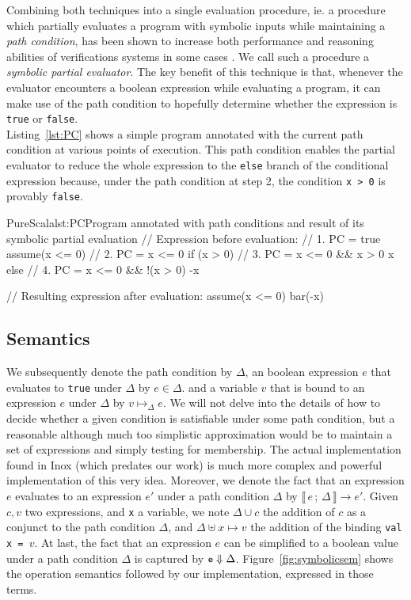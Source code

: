 \documentclass[a4paper,twoside]{article}
\newcommand{\lb}[2]{\llbracket\, #1\,;\, #2\, \rrbracket}
\newcommand{\InlineS}[1]{\lstinline[language=PureScala,basicstyle=\small\ttfamily,columns=fixed]|#1|}
\newcommand{\RefFig}[1]{Figure~\ref{#1}}
\newcommand{\RefCode}[1]{Listing~\ref{#1}}
\newcommand{\stt}[1]{\texttt{\small{#1}}}
\begin{document}
Combining both techniques into a single evaluation procedure, ie. a procedure which partially evaluates a program with symbolic inputs while maintaining a \textit{path condition}, has been shown to increase both performance and reasoning abilities of verifications systems in some cases \cite{partialsym}. We call such a procedure a \textit{symbolic partial evaluator}. The key benefit of this technique is that, whenever the evaluator encounters a boolean expression while evaluating a program, it can make use of the path condition to hopefully determine whether the expression is \InlineS{true} or \InlineS{false}.\\

\RefCode{lst:PC} shows a simple program annotated with the current path condition at various points of execution. This path condition enables the partial evaluator to reduce the whole expression to the \InlineS{else} branch of the conditional expression  because, under the path condition at step 2, the condition \InlineS{x > 0} is provably \InlineS{false}.

\begin{Code}{PureScala}{lst:PC}{Program annotated with path conditions and result of its symbolic partial evaluation}
// Expression before evaluation:
{
  // 1. PC = true
  assume(x <= 0)
  // 2. PC = x <= 0
  if (x > 0) {
    // 3. PC = x <= 0 && x > 0
    x
  } else {
    // 4. PC = x <= 0 && !(x > 0)
    -x
  }
}

// Resulting expression after evaluation:
{
  assume(x <= 0)
  bar(-x)
}
\end{Code}

\subsection{Semantics}

We subsequently denote the path condition by $\Delta$, an boolean expression $e$ that  evaluates to \InlineS{true} under $\Delta$ by $e \in \Delta$. and a variable $v$ that is bound to an expression $e$ under $\Delta$ by $v \mapsto_\Delta e$. We will not delve into the details of how to decide whether a given condition is satisfiable under some path condition, but a reasonable although much too simplistic approximation would be to maintain a set of expressions and simply testing for membership. The actual implementation found in Inox (which predates our work) is much more complex and powerful implementation of this very idea. Moreover, we denote the fact that an expression $e$ evaluates to an expression $e'$ under a path condition $\Delta$ by $\lb{e}{\Delta} \longrightarrow e'$. Given $c, v$ two expressions, and \stt{x} a variable, we note $\Delta \cup c$ the addition of $c$ as a conjunct to the path condition $\Delta$, and $\Delta \uplus x \mapsto v$ the addition of the binding \stt{val x = $v$}. At last, the fact that an expression $e$ can be simplified to a boolean value under a path condition $\Delta$ is captured by $\stt{e} \Downarrow \Delta$. \RefFig{fig:symbolicsem} shows the operation semantics followed by our implementation, expressed in those terms. \\
\end{document}

